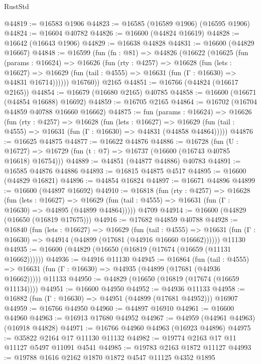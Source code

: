 \begin{lexlean}{RustStd}
\begin{coremodule}
{\begin{coremodule}
{{{{{{{{{{{{{{{{{{{{{{{{{{{{{{{{{{{{{{{{{{{{{{{{{{{{{{{@44819 := @16583 @1906
@44823 := @16585 (@16589 @1906) (@16595 @1906)
@44824 := @16604 @40782
@44826 := @16600 (@44824 @16619)
@44828 := @16642 (@16643 @1906)
@44829 := @16638 @44828
@44831 := @16600 (@44829 @16667)
@44848 := @16599
    (fun (fn : @81) =>
    @44826
      (@16622
        (@16625
          (fun (params : @16624) =>
          @16626
            (fun (rty : @4257) =>
            @16628
              (fun (lets : @16627) =>
              @16629 (fun (tail : @4555) => @16631 (fun (Γ : @16630) => @44831 @16714))))))
        @16760))
    @2165
@44851 := @16766 (@44824 (@16617 @2165))
@44854 := @16679 (@16680 @2165) @40785
@44858 := @16600 (@16671 (@44854 @16688) @16692)
@44859 := @16705 @2165
@44864 := @16702 (@16704 @44859 @40788 @16660 @16662)
@44875 := fun (params : @16624) =>
  @16626
    (fun (rty : @4257) =>
    @16628
      (fun (lets : @16627) =>
      @16629 (fun (tail : @4555) => @16631 (fun (Γ : @16630) => @44831 (@44858 @44864)))))
@44876 := @16625 @44875
@44877 := @16622 @44876
@44886 := @16728
    (fun (U : @16727) => @16729 (fun (t : @7) => @16737 (@16600 (@16743 @40785 @16618) @16754)))
@44889 := @44851 (@44877 @44886) @40783
@44891 := @16585 @44876 @44886
@44893 := @16815 @44875 @4517
@44895 := @16600 (@44829 @16821)
@44896 := @44854 @16824
@44897 := @16671 @44896
@44899 := @16600 (@44897 @16692)
@44910 := @16818
    (fun (rty : @4257) =>
    @16628
      (fun (lets : @16627) =>
      @16629 (fun (tail : @4555) => @16631 (fun (Γ : @16630) => @44895 (@44899 @44864)))))
    @4709
@44914 := @16600 (@44829 (@16650 (@16819 @17675)))
@44916 := @17682 @44859 @40788
@44928 := @16840
    (fun (lets : @16627) =>
    @16629
      (fun (tail : @4555) =>
      @16631 (fun (Γ : @16630) => @44914 (@44899 (@17681 (@44916 @16660 @16662))))))
    @11130
@44935 := @16600 (@44829 (@16650 (@16819 (@17674 (@16659 (@11131 @16662))))))
@44936 := @44916 @11130
@44945 := @16864
    (fun (tail : @4555) => @16631 (fun (Γ : @16630) => @44935 (@44899 (@17681 (@44936 @16662)))))
    @11133
@44950 := @44829 (@16650 (@16819 (@17674 (@16659 @11134))))
@44951 := @16600 @44950
@44952 := @44936 @11133
@44958 := @16882 (fun (Γ : @16630) => @44951 (@44899 (@17681 @44952))) @16907
@44959 := @16766 @44950
@44960 := @44897 @16910
@44961 := @16600 @44960
@44963 := @16913 @17680 @44952
@44967 := @44959 (@44961 @44963) (@16918 @44828)
@44971 := @16766 @44960 @44963 (@16923 @44896)
@44975 := @35822 @2164 @17 @11130 @11132
@44982 := @19774 @2163 @17 @11 @11127 @5497 @11091 @4541
@44985 := @19783 @2163 @1872 @11127
@44993 := @19788 @1616 @2162 @1870 @1872 @4547 @11125 @4352 @1895
}}}}}}}}}}}}}}}}}}}}}}}}}}}}}}}}}}}}}}}}}}}}}}}}}}}}}}}
\end{coremodule}}
\end{coremodule}
\end{lexlean}
